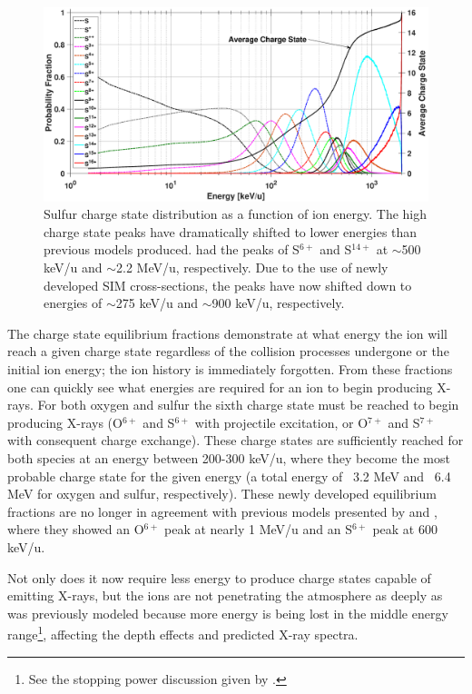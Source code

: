 \documentclass[draft]{agujournal2018}
\begin{document}
\begin{figure}[ht]
    \centering
    \includegraphics[width=\textwidth]{Figures/CSDsul.eps}
    \caption{Sulfur charge state distribution as a function of ion energy. The high charge state peaks have dramatically shifted to lower energies than previous models produced. \citet{ozak2010} had the peaks of S$^{6+}$ and S$^{14+}$ at $\sim$500 keV/u and $\sim$2.2 MeV/u, respectively. Due to the use of newly developed SIM cross-sections, the peaks have now shifted down to energies of $\sim$275 keV/u and $\sim$900 keV/u, respectively.}
    \label{fig:CSDsul}
\end{figure}

The charge state equilibrium fractions demonstrate at what energy the ion will reach a given charge state regardless of the collision processes undergone or the initial ion energy; the ion history is immediately forgotten.
From these fractions one can quickly see what energies are required for an ion to begin producing X-rays.
For both oxygen and sulfur the sixth charge state must be reached to begin producing X-rays (O$^{6+}$ and S$^{6+}$ with projectile excitation, or O$^{7+}$ and S$^{7+}$ with consequent charge exchange).
These charge states are sufficiently reached for both species at an energy between 200-300 keV/u, where they become the most probable charge state for the given energy (a total energy of ~3.2 MeV and ~6.4 MeV for oxygen and sulfur, respectively).
These newly developed equilibrium fractions are no longer in agreement with previous models presented by \citet{ozak2010} and \citet{houston2018}, where they showed an O$^{6+}$ peak at nearly 1 MeV/u and an S$^{6+}$ peak at 600 keV/u.

Not only does it now require less energy to produce charge states capable of emitting X-rays, but the ions are not penetrating the atmosphere as deeply as was previously modeled because more energy is being lost in the middle energy range\footnote{See the stopping power discussion given by \citet{schultz2019}.}, affecting the depth effects and predicted X-ray spectra.
\end{document}

